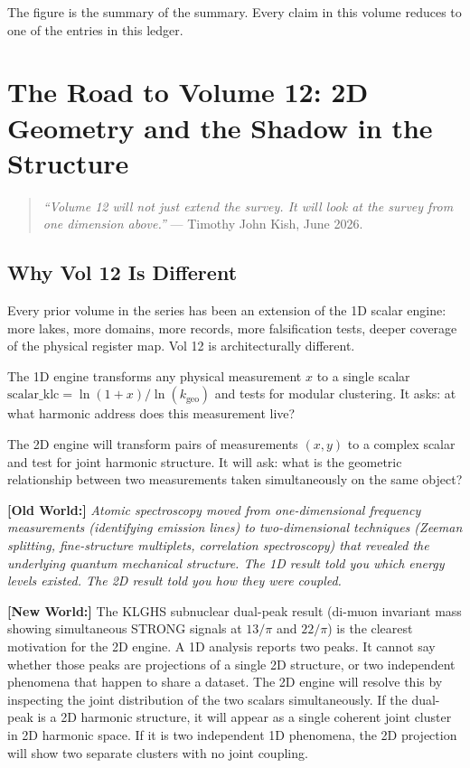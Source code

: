 \documentclass[11pt, letterpaper, openany]{book}
\newcommand{\oldworld}[1]{\noindent\textbf{\color{goldseal}[Old World:]} \textit{#1}\medskip}
\newcommand{\newworld}[1]{\noindent\textbf{\color{kishblue}[New World:]} #1\medskip}
\begin{document}
\begin{empiricalbox}
The figure is the summary of the summary. Every claim in this volume
reduces to one of the entries in this ledger.

\clearpage

\chapter{The Road to Volume 12: 2D Geometry and the Shadow in the Structure}

\begin{quote}
\textit{``Volume 12 will not just extend the survey. It will look at the survey
from one dimension above.''} --- Timothy John Kish, June 2026.
\end{quote}

\section{Why Vol 12 Is Different}

Every prior volume in the series has been an extension of the 1D scalar engine:
more lakes, more domains, more records, more falsification tests, deeper coverage
of the physical register map. Vol 12 is architecturally different.

The 1D engine transforms any physical measurement $x$ to a single scalar
$\text{scalar\_klc} = \ln(1+x)/\ln(k_\text{geo})$ and tests for modular
clustering. It asks: at what harmonic address does this measurement live?

The 2D engine will transform pairs of measurements $(x, y)$ to a complex scalar
and test for joint harmonic structure. It will ask: what is the geometric
relationship between two measurements taken simultaneously on the same object?

\oldworld{Atomic spectroscopy moved from one-dimensional frequency measurements
(identifying emission lines) to two-dimensional techniques (Zeeman splitting,
fine-structure multiplets, correlation spectroscopy) that revealed the underlying
quantum mechanical structure. The 1D result told you which energy levels
existed. The 2D result told you how they were coupled.}

\newworld{The KLGHS subnuclear dual-peak result (di-muon invariant mass showing
simultaneous STRONG signals at $13/\pi$ and $22/\pi$) is the clearest
motivation for the 2D engine. A 1D analysis reports two peaks. It cannot say
whether those peaks are projections of a single 2D structure, or two independent
phenomena that happen to share a dataset. The 2D engine will resolve this by
inspecting the joint distribution of the two scalars simultaneously. If the
dual-peak is a 2D harmonic structure, it will appear as a single coherent
joint cluster in 2D harmonic space. If it is two independent 1D phenomena,
the 2D projection will show two separate clusters with no joint coupling.}


\end{empiricalbox}
\end{document}
